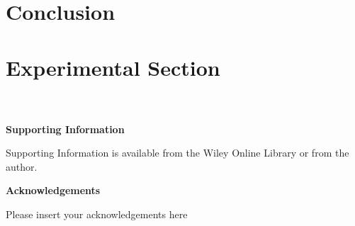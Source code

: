 \documentclass{WileyMSP-template}
\begin{document}












\section{Conclusion}


\section{Experimental Section}
\\
\\



\medskip
\textbf{Supporting Information} \par %
Supporting Information is available from the Wiley Online Library or from the author.



\medskip
\textbf{Acknowledgements} \par %
Please insert your acknowledgements here

\medskip

%

% 

\end{document}
